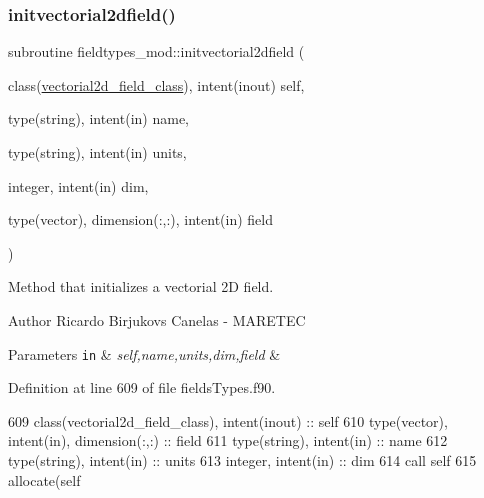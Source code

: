 \subsubsection{\texorpdfstring{initvectorial2dfield()}{initvectorial2dfield()}}
{\footnotesize\ttfamily subroutine fieldtypes\+\_\+mod\+::initvectorial2dfield (\begin{DoxyParamCaption}\item[{class(\mbox{\hyperlink{structfieldtypes__mod_1_1vectorial2d__field__class}{vectorial2d\+\_\+field\+\_\+class}}), intent(inout)}]{self,  }\item[{type(string), intent(in)}]{name,  }\item[{type(string), intent(in)}]{units,  }\item[{integer, intent(in)}]{dim,  }\item[{type(vector), dimension(\+:,\+:), intent(in)}]{field }\end{DoxyParamCaption})\hspace{0.3cm}{\ttfamily [private]}}



Method that initializes a vectorial 2D field. 

\begin{DoxyAuthor}{Author}
Ricardo Birjukovs Canelas -\/ M\+A\+R\+E\+T\+EC 
\end{DoxyAuthor}

\begin{DoxyParams}[1]{Parameters}
\mbox{\tt in}  & {\em self,name,units,dim,field} & \\
\hline
\end{DoxyParams}


Definition at line 609 of file fields\+Types.\+f90.


\begin{DoxyCode}
609     \textcolor{keywordtype}{class}(vectorial2d\_field\_class), \textcolor{keywordtype}{intent(inout)} :: self
610     \textcolor{keywordtype}{type}(vector), \textcolor{keywordtype}{intent(in)}, \textcolor{keywordtype}{dimension(:,:)} :: field
611     \textcolor{keywordtype}{type}(string), \textcolor{keywordtype}{intent(in)} :: name
612     \textcolor{keywordtype}{type}(string), \textcolor{keywordtype}{intent(in)} :: units
613     \textcolor{keywordtype}{integer}, \textcolor{keywordtype}{intent(in)} :: dim
614     \textcolor{keyword}{call }self%
615     \textcolor{keyword}{allocate}(self%
\end{DoxyCode}
\mbox{\label{namespacefieldtypes__mod_a20d935cfa1513350667d04f969be5e26}} 
